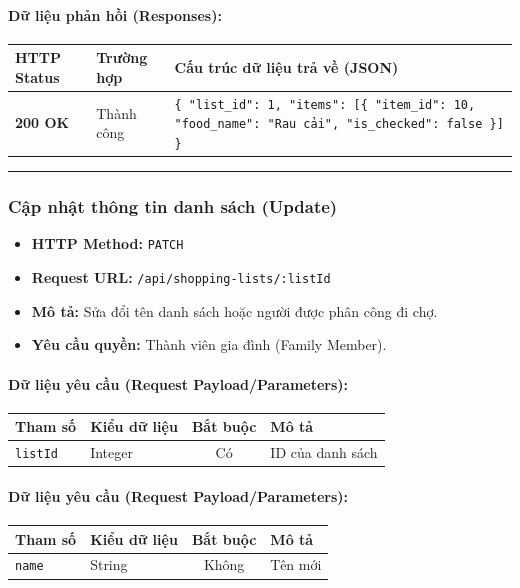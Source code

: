 \documentclass[12pt,a4paper]{article}
\begin{document}
\paragraph{Dữ liệu phản hồi (Responses):}
\begin{longtable}{|p{2.8cm}|p{3.2cm}|p{8.0cm}|}
\hline
\textbf{HTTP Status} & \textbf{Trường hợp} & \textbf{Cấu trúc dữ liệu trả về (JSON)} \\ \hline
\endhead
\textbf{200 OK} & Thành công & \texttt{\{ "list\_id": 1, "items": [\{ "item\_id": 10, "food\_name": "Rau cải", "is\_checked": false \}] \}} \\ \hline
\end{longtable}

\vskip 0.4cm
\noindent\rule{\textwidth}{0.3pt}
\vskip 0.4cm

\subsubsection{Cập nhật thông tin danh sách (Update)}
\begin{itemize}[leftmargin=*]
    \item \textbf{HTTP Method:} \texttt{PATCH}
    \item \textbf{Request URL:} \texttt{/api/shopping-lists/:listId}
    \item \textbf{Mô tả:} Sửa đổi tên danh sách hoặc người được phân công đi chợ.
    \item \textbf{Yêu cầu quyền:} Thành viên gia đình (Family Member).
\end{itemize}

\paragraph{Dữ liệu yêu cầu (Request Payload/Parameters):}
\begin{longtable}{|p{2.8cm}|p{2.2cm}|c|p{7.0cm}|}
\hline
\textbf{Tham số} & \textbf{Kiểu dữ liệu} & \textbf{Bắt buộc} & \textbf{Mô tả} \\ \hline
\endhead
\texttt{listId} & Integer & Có & ID của danh sách \\ \hline
\end{longtable}

\paragraph{Dữ liệu yêu cầu (Request Payload/Parameters):}
\begin{longtable}{|p{2.8cm}|p{2.2cm}|c|p{7.0cm}|}
\hline
\textbf{Tham số} & \textbf{Kiểu dữ liệu} & \textbf{Bắt buộc} & \textbf{Mô tả} \\ \hline
\endhead
\texttt{name} & String & Không & Tên mới \\ \hline
\end{longtable}
\end{document}

